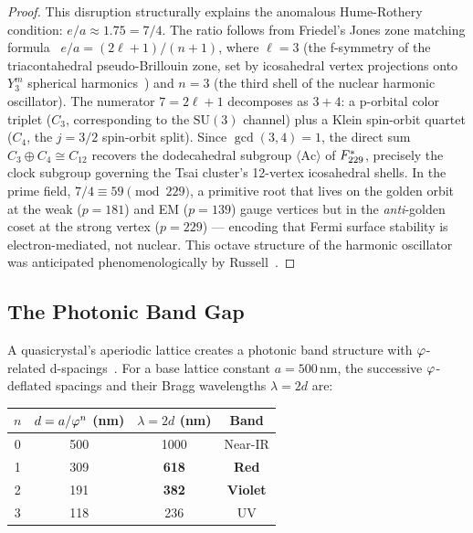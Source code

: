 \begin{proof}
This disruption structurally explains the anomalous Hume-Rothery condition: $e/a \approx 1.75 = 7/4$.  The ratio follows from Friedel's Jones zone matching formula~\cite{Friedel88} $e/a = (2\ell+1)/(n+1)$, where $\ell = 3$ (the f-symmetry of the triacontahedral pseudo-Brillouin zone, set by icosahedral vertex projections onto $Y_3^m$ spherical harmonics~\cite{Elser85}) and $n = 3$ (the third shell of the nuclear harmonic oscillator).  The numerator $7 = 2\ell + 1$ decomposes as $3 + 4$: a p-orbital color triplet ($C_3$, corresponding to the $\mathrm{SU}(3)$ channel) plus a Klein spin-orbit quartet ($C_4$, the $j = 3/2$ spin-orbit split).  Since $\gcd(3,4) = 1$, the direct sum $C_3 \oplus C_4 \cong C_{12}$ recovers the dodecahedral subgroup $\langle\mathrm{Ac}\rangle$ of $F_{229}^*$, precisely the clock subgroup governing the Tsai cluster's 12-vertex icosahedral shells.  In the prime field, $7/4 \equiv 59 \pmod{229}$, a primitive root that lives on the golden orbit at the weak ($p = 181$) and EM ($p = 139$) gauge vertices but in the \emph{anti}-golden coset at the strong vertex ($p = 229$) --- encoding that Fermi surface stability is electron-mediated, not nuclear.  This octave structure of the harmonic oscillator was anticipated phenomenologically by Russell~\cite{Russell26}.
\qedhere
\end{proof}

\subsection{The Photonic Band Gap}

A quasicrystal's aperiodic lattice creates a photonic band structure with $\varphi$-related d-spacings~\cite{Man05,Vardeny13}.  For a base lattice constant $a = 500\,\mathrm{nm}$, the successive $\varphi$-deflated spacings and their Bragg wavelengths $\lambda = 2d$ are:

\begin{center}
\begin{tabular}{cccc}
\toprule
$n$ & $d = a/\varphi^n$ (nm) & $\lambda = 2d$ (nm) & Band \\
\midrule
0 & 500 & 1000 & Near-IR \\
1 & 309 & \textbf{618} & \textbf{Red} \\
2 & 191 & \textbf{382} & \textbf{Violet} \\
3 & 118 & 236 & UV \\
\bottomrule
\end{tabular}
\end{center}

